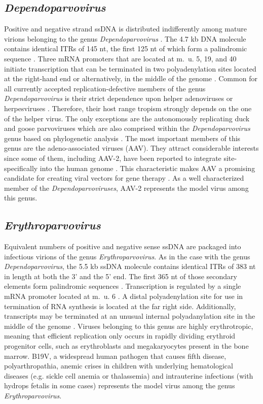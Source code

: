 \subsection{\textit{Dependoparvovirus}}
Positive and negative strand ssDNA is distributed indifferently among mature virions belonging to the genus \textit{Dependoparvovirus} \cite{pmid5014934, pmid5264145}. The 4.7 kb DNA molecule contains identical ITRs of 145 nt, the first 125 nt of which form a palindromic sequence \cite{pmid6246271}. Three mRNA promoters that are located at m.~u. 5, 19, and 40 initiate transcription that can be terminated in two polyadenylation sites located at the right-hand end or alternatively, in the middle of the genome \cite{pmid6253077, pmid6281463}. Common for all currently accepted replication-defective members of the genus \textit{Dependoparvovirus} is their strict dependence upon helper adenoviruses or herpesviruses \cite{pmid4318977, pmid6270377, pmid5227666}. Therefore, their host range tropism strongly depends on the one of the helper virus. 
The only exceptions are the autonomously replicating duck and goose parvoviruses which are also comprised within the \textit{Dependoparvovirus} genus based on phylogenetic analysis \cite{icvt}. The most important members of this genus are the adeno-associated viruses (AAV). They attract considerable interests since some of them, including AAV-2, have been reported to integrate site-specifically into the human genome \cite{pmid2156265, pmid1653762, pmid1334463, pmid1657596}. This characteristic makes AAV a promising candidate for creating viral vectors for gene therapy \cite{pmid18854481, pmid21499295}. As a well characterized member of the \textit{Dependoparvoviruses}, AAV-2 represents the model virus among this genus.  


\subsection{\textit{Erythroparvovirus}}
\label{B19V}
Equivalent numbers of positive and negative sense ssDNA are packaged into infectious virions of the genus \textit{Erythroparvovirus}. As in the case with the genus \textit{Dependoparvovirus}, the 5.5 kb ssDNA molecule contains identical ITRs of 383 nt in length at both the 3’ and the 5’ end. The first 365 nt of those secondary elements form palindromic sequences \cite{pmid2408228}. Transcription is regulated by a single mRNA promoter located at m.~u. 6 \cite{pmid3824910}. A distal polyadenylation site for use in termination of RNA synthesis is located at the far right side. Additionally, transcripts may be terminated at an unusual internal polyadanylation site in the middle of the genome \cite{pmid3599180}. Viruses belonging to this genus are highly erythrotropic, meaning that efficient replication only occurs in rapidly dividing erythroid progenitor cells, such as erythroblasts and megakaryocytes present in the bone marrow.
B19V, a widespread human pathogen that causes fifth disease, polyarthropathia, anemic crises in children with underlying hematological diseases (e.g. sickle cell anemia or thalassemia) and intrauterine infections (with hydrops fetalis in some cases) \cite{pmid12097253} represents the model virus among the genus \textit{Erythroparvovirus}. 


